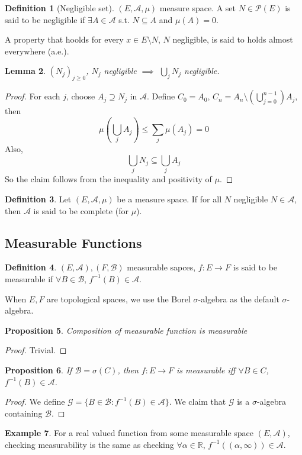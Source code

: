 \documentclass{article}
\theoremstyle{definition}
\newtheorem{defn}{Definition}[section]
\newtheorem{example}[defn]{Example}
\theoremstyle{remark}
\theoremstyle{plain}
\newtheorem{prop}[defn]{Proposition}
\newtheorem{lem}[defn]{Lemma}
\newcommand{\RR}{\mathbb{R}}
\begin{document}
\begin{defn}[Negligible set]
 $(E,\mathcal{A},\mu)$ measure space. A set $N\in\mathcal{P}(E)$ is said to be negligible if $\exists A\in \mathcal{A}$ s.t. $N\subseteq A$ and $\mu(A)=0$.
\end{defn}
A property that hoolds for every $x\in E\setminus N$, $N$ negligible, is said to holds almost everywhere (a.e.).
\begin{lem}
    $(N_j)_{j\ge0}$, $N_j$ negligible $\implies $ $\bigcup_j N_j$ negligible.
\end{lem}
\begin{proof}
    For each $j$, choose $A_j\supseteq N_j$ in $\mathcal{A}$. Define $C_0=A_0$, $C_n=A_n\setminus(\bigcup_{j=0}^{n-1})A_j$, then \[\mu(\bigcup_j A_j)\le\sum_j\mu(A_j)=0\]
    Also, \[\bigcup_j N_j\subseteq\bigcup_j A_j\]
    So the claim follows from the inequality and positivity of $\mu$.
\end{proof}
\begin{defn}
    Let $(E,\mathcal{A},\mu)$ be a measure space. If for all $N$ negligible $N\in\mathcal{A}$, then $\mathcal{A}$ is said to be complete (for $\mu$).
\end{defn}

\subsection{Measurable Functions}
\begin{defn}
    $(E,\mathcal{A}),(F,\mathcal{B})$ measurable sapces, $f:E\to F$ is said to be measurable if $\forall B\in\mathcal{B}$, $f^{-1}(B)\in\mathcal{A}$.
\end{defn}
When $E,F$ are topological spaces, we use the Borel $\sigma$-algebra as the default $\sigma$-algebra.
\begin{prop}
    Composition of measurable function is measurable
\end{prop}
\begin{proof}
    Trivial.
\end{proof}
\begin{prop}
    If $\mathcal{B}=\sigma(C)$, then $f:E\to F$ is measurable iff $\forall B\in C$, $f^{-1}(B)\in\mathcal{A}$.
\end{prop}
\begin{proof}
    We define $\mathcal{G}=\{B\in\mathcal{B}:f^{-1}(B)\in\mathcal{A}\}$. We claim that $\mathcal{G}$ is a $\sigma$-algebra containing $\mathcal{B}$.
\end{proof}
\begin{example}
    For a real valued function from some measurable space $(E,\mathcal{A})$, checking measurability is the same as checking $\forall \alpha\in\RR$, $f^{-1}((\alpha,\infty))\in\mathcal{A}$.
\end{example}
\end{document}
